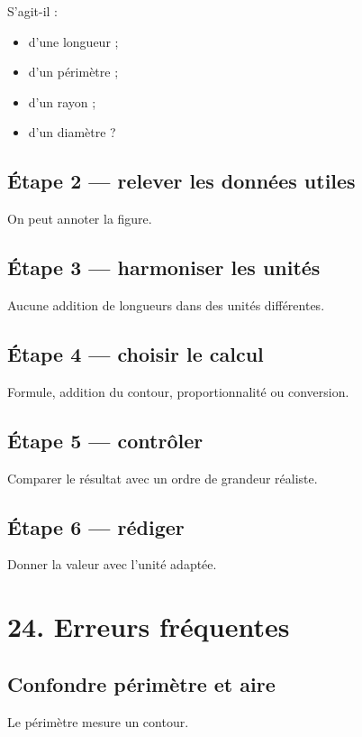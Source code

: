 S’agit-il :

\begin{itemize}
\item d’une longueur ;
\item d’un périmètre ;
\item d’un rayon ;
\item d’un diamètre ?
\end{itemize}

\subsection{Étape 2 — relever les données utiles}

On peut annoter la figure.

\subsection{Étape 3 — harmoniser les unités}

Aucune addition de longueurs dans des unités différentes.

\subsection{Étape 4 — choisir le calcul}

Formule, addition du contour, proportionnalité ou conversion.

\subsection{Étape 5 — contrôler}

Comparer le résultat avec un ordre de grandeur réaliste.

\subsection{Étape 6 — rédiger}

Donner la valeur avec l’unité adaptée.

\section{24. Erreurs fréquentes}

\subsection{Confondre périmètre et aire}

Le périmètre mesure un contour.

